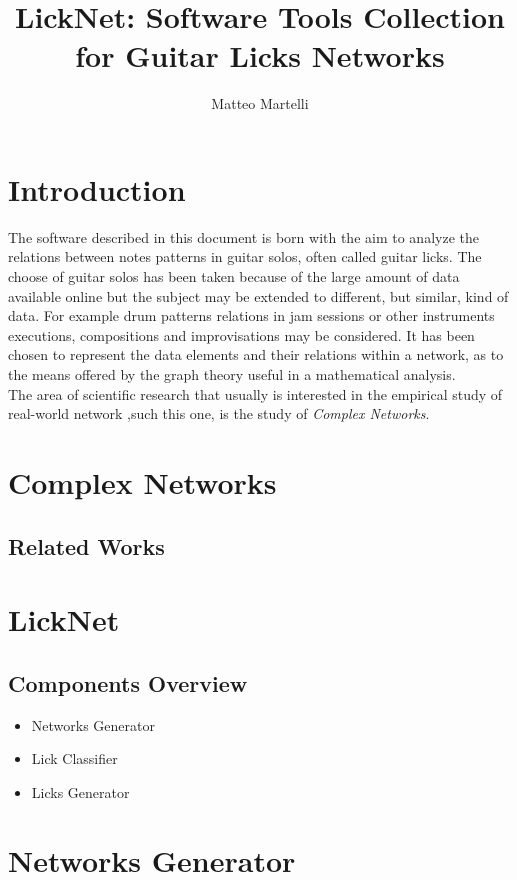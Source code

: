 \documentclass[a4paper,10pt]{paper}
\title{LickNet: Software Tools Collection for Guitar Licks Networks}
\author{Matteo Martelli}
\begin{document}
\maketitle

\begin{abstract}
\end{abstract}
\section{Introduction}
The software described in this document is born with the aim to analyze
the relations between notes patterns in guitar
solos, often called guitar licks. The choose of guitar solos has been taken 
because of the large amount of data available online but the subject may 
be extended to
different, but similar, kind of data. For example drum patterns
relations in jam sessions or other instruments executions, compositions
and improvisations may be considered. It has been chosen to represent
the data elements and their relations within a network, as to the
means offered by the graph theory useful in a mathematical analysis.\\
The area of scientific research
that usually is interested in the empirical study of real-world network
,such this one, is the study of \emph{Complex Networks}.

\section{Complex Networks}
\subsection{Related Works}

\section{LickNet}
\subsection{Components Overview}
\begin{itemize}
\item Networks Generator
\item Lick Classifier
\item Licks Generator
\end{itemize}
\section{Networks Generator}
\end{document}
